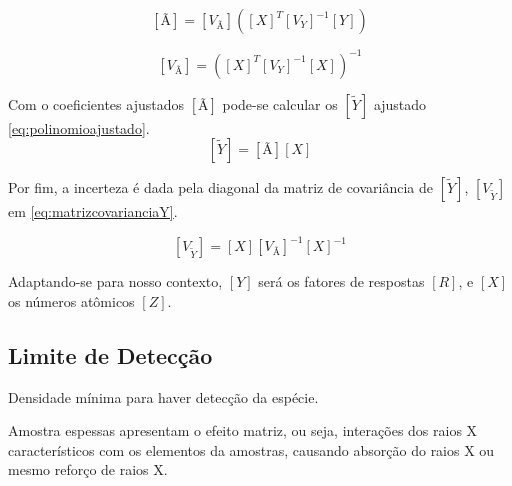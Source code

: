 \begin{equation}
  \label{eq:coeficientesajustados}
  [Ã] = [V_{Ã}] ([X]^T {[V_Y]}^{-1} [Y])
\end{equation}

\begin{equation}
  \label{eq:matrizcovariancia}
  [V_{Ã}] = ([X]^T [V_Y]^{-1} [X])^{-1}
\end{equation}

Com o coeficientes ajustados $[Ã]$ pode-se calcular os $[\tilde{Y}]$ ajustado \ref{eq:polinomioajustado}.
\begin{equation}
  \label{eq:polinomioajustado}
  [\tilde{Y}] = [Ã][X]
\end{equation}

Por fim, a incerteza é dada pela diagonal da matriz de covariância de $[\tilde{Y}]$, 
$[V_{\tilde{Y}}]$ em \ref{eq:matrizcovarianciaY}.

\begin{equation}
  \label{eq:matrizcovarianciaY}
  [V_{\tilde{Y}}] = [X] [V_{Ã}]^{-1} [X]^{-1}
\end{equation}

Adaptando-se para nosso contexto, $[Y]$ será os fatores de respostas $[R]$,
e $[X]$ os números atômicos $[Z]$.

\subsection{Limite de Detecção}

Densidade mínima para haver detecção da espécie. %

Amostra espessas apresentam o efeito matriz, ou seja, interações dos 
raios X característicos com os elementos da amostras, causando 
absorção do raios X ou mesmo reforço de raios X.





